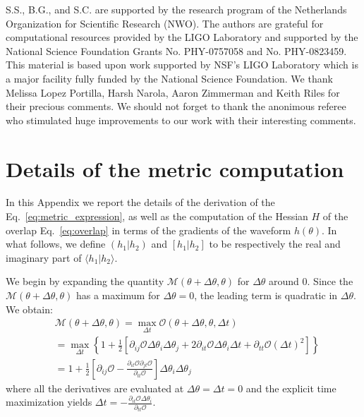 \documentclass[twocolumn,showpacs,preprintnumbers,nofootinbib,prd,
superscriptaddress,10pt]{revtex4-2}
\newcommand{\scalar}[2]{\langle #1|#2 \rangle}
\newcommand{\rescalar}[2]{( #1 |#2 )}
\newcommand{\imscalar}[2]{[ #1|#2 ]}
\begin{document}
        \begin{acknowledgments}
		S.S., B.G., and S.C. are supported by the research program of the Netherlands Organization for Scientific Research (NWO).
		The authors are grateful for computational resources provided by the LIGO Laboratory and supported by the National Science Foundation Grants No. PHY-0757058 and No. PHY-0823459. This material is based upon work supported by NSF’s LIGO Laboratory which is a major facility fully funded by the National Science Foundation.
		We thank Melissa Lopez Portilla, Harsh Narola, Aaron Zimmerman and Keith Riles for their precious comments. We should not forget to thank the anonimous referee who stimulated huge improvements to our work with their interesting comments.
        \end{acknowledgments}

\appendix

\section{Details of the metric computation}\label{app:metric}

In this Appendix we report the details of the derivation of the Eq.~\eqref{eq:metric_expression}, as well as the computation of the Hessian $H$ of the overlap Eq.~\eqref{eq:overlap} in terms of the gradients of the waveform $h(\theta)$. 
In what follows, we define $\rescalar{h_1}{h_2}$ and $\imscalar{h_1}{h_2}$ to be respectively the real and imaginary part of $\scalar{h_1}{h_2}$.

We begin by expanding the quantity $\mathcal{M}(\theta+\Delta\theta,\theta )$ for $\Delta\theta$ around $0$. Since the $\mathcal{M}(\theta+\Delta\theta,\theta )$ has a maximum for $\Delta\theta = 0$, the leading term is quadratic in $\Delta\theta$.
We obtain:
\begin{align} \label{eq:metric_derivation}
	&\mathcal{M}(\theta+\Delta\theta,\theta ) = \max_{\Delta t} \mathcal{O}(\theta + \Delta\theta, \theta, \Delta t) \nonumber\\
	& =	\max_{\Delta t} \left\{ 1+ \frac{1}{2}\left[ \partial_{ij}\mathcal{O} \Delta\theta_i \Delta\theta_j + 2  \partial_{it}\mathcal{O} \Delta\theta_i \Delta t + \partial_{tt}\mathcal{O} (\Delta t)^2 \right] \right\}  \nonumber \\
	&= 1 + \frac{1}{2}\left[ \partial_{ij}\mathcal{O} - \frac{\partial_{it}\mathcal{O} \partial_{jt}\mathcal{O}}{\partial_{tt}\mathcal{O}}\right] \Delta\theta_i \Delta\theta_j
\end{align}
where all the derivatives are evaluated at ${\Delta\theta = \Delta t = 0}$ and the explicit time maximization yields
${\Delta t = -\frac{\partial_{it}\mathcal{O} \Delta\theta_i}{\partial_{tt}\mathcal{O}}}$.
\end{document}
